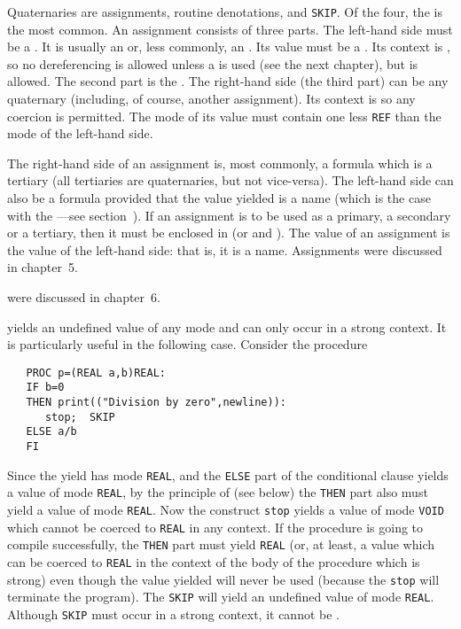 Quaternaries are assignments, routine denotations,
 and \verb|SKIP|. Of the
four, the  is the most common.  An assignment consists
of three parts. The left-hand side must be a . It is
usually an  or, less commonly, an
. Its value must be a .
Its context is , so no dereferencing is
allowed unless a  is used (see the next chapter), but
 is allowed.  The second
part is the .  The right-hand side (the third
part) can be any quaternary (including, of course, another
assignment). Its context is  so any
coercion is permitted.  The mode of its value must contain one less
\verb|REF| than the mode of the left-hand side.

The right-hand side of an assignment is, most commonly, a formula
which is a tertiary (all tertiaries are quaternaries, but not
vice-versa).  The left-hand side can also be a formula provided that
the value yielded is a name (which is the case with the
---see section~). If an
assignment is to
be used as a primary, a secondary or a tertiary, then it must be
enclosed in (or  and ).  The
value of an assignment is the value of the left-hand side: that is,
it is a name.  Assignments were discussed in chapter~5.

 were discussed in
chapter~6.

 yields an undefined value of any mode
and can only occur in a strong context. It is particularly useful in
the following case. Consider the procedure
\begin{verbatim}
   PROC p=(REAL a,b)REAL:
   IF b=0
   THEN print(("Division by zero",newline)):
      stop;  SKIP
   ELSE a/b
   FI
\end{verbatim}
\noindent
Since the yield has mode \verb|REAL|, and the \verb|ELSE| part of the
conditional clause yields a value of mode \verb|REAL|, by the principle
of  (see below) the \verb|THEN| part also
must yield a value of mode \verb|REAL|.  Now the construct \verb|stop|
yields a value of mode \verb|VOID| which cannot be coerced to
\verb|REAL| in any context.  If the procedure is going to compile
successfully, the \verb|THEN| part must yield \verb|REAL| (or, at
least, a value which can be coerced to \verb|REAL| in the context of
the body of the procedure which is strong) even though the value
yielded will never be used (because the \verb|stop| will terminate the
program).  The \verb|SKIP| will yield an undefined value of mode
\verb|REAL|.  Although \verb|SKIP| must occur in a strong context, it
cannot be .

